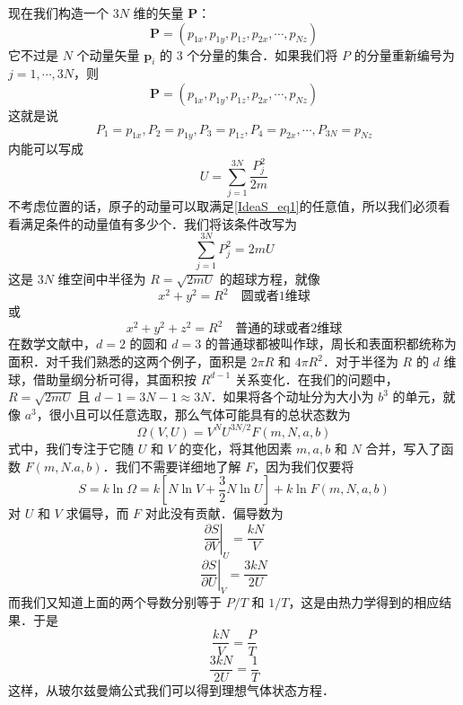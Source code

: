 现在我们构造一个 $3N $ 维的矢量 $\mathbf P$：
\begin{equation}
\mathbf{P}=\left( p_{1x},p_{1y},p_{1z},p_{2x},\cdots ,p_{Nz} \right) 
\end{equation}
它不过是 $N$ 个动量矢量 $\boldsymbol p_i$ 的 $3 $ 个分量的集合．如果我们将 $P $ 的分量重新编号为 $j=1, \cdots , 3N$，则
\begin{equation}
\mathbf{P}=\left( p_{1x},p_{1y},p_{1z},p_{2x},\cdots ,p_{Nz} \right) 
\end{equation}
这就是说
\begin{equation}
P_1=p_{1x},P_2=p_{1y},P_3=p_{1z},P_4=p_{2x},\cdots ,P_{3N}=p_{Nz}
\end{equation}
内能可以写成
\begin{equation} \label{IdeaS_eq1}
U=\sum_{j=1}^{3N}{\frac{P_{j}^{2}}{2m}}
\end{equation}
不考虑位置的话，原子的动量可以取满足\eqref{IdeaS_eq1}的任意值，所以我们必须看看满足条件的动量值有多少个．我们将该条件改写为
\begin{equation}
\sum_{j=1}^{3N}{P_{j}^{2}}=2mU
\end{equation}
这是 $3N$ 维空间中半径为 $R=\sqrt{2mU}$ 的超球方程，就像
\begin{equation}
x^2+y^2=R^2 \quad \text{圆或者1维球}
\end{equation}
或
\begin{equation}
x^2+y^2+z^2=R^2 \quad \text{普通的球或者2维球}
\end{equation}
在数学文献中，$ d=2 $ 的圆和 $d=3 $ 的普通球都被叫作球，周长和表面积都统称为面积．对千我们熟悉的这两个例子，面积是 $2\pi R$ 和 $4\pi R^2$．对于半径为 $R $ 的 $d $ 维球，借助量纲分析可得，其面积按 $R^{d-1}$ 关系变化．在我们的问题中，$R=\sqrt{2mU}$ 且 $d-1 = 3N-1 \approx 3N$．如果将各个动址分为大小为 $b^3$ 的单元，就像 $a^3$，很小且可以任意选取，那么气体可能具有的总状态数为
\begin{equation}
\Omega \left( V,U \right) =V^NU^{3N/2}F\left( m,N,a,b \right) 
\end{equation}
式中，我们专注于它随 $U $ 和 $V $ 的变化，将其他因素 $m, a, b $ 和 $N $ 合并，写入了函数 $F(m, N. a, b) $．我们不需要详细地了解 $F$，因为我们仅要将
\begin{equation}
S=k\ln \Omega =k\left[ N\ln V+\frac{3}{2}N\ln U \right] +k\ln F\left( m,N,a,b \right) 
\end{equation}
对 $U $ 和 $V $ 求偏导，而 $F $ 对此没有贡献．偏导数为
\begin{equation}
\left. \frac{\partial S}{\partial V} \right |_{U}^{}=\frac{kN}{V}
\end{equation}
\begin{equation}
\left. \frac{\partial S}{\partial U}\right |_{V}^{}=\frac{3kN}{2U}
\end{equation}
而我们又知道上面的两个导数分别等于 $P/T$ 和 $1/T$，这是由热力学得到的相应结果．于是
\begin{equation}
\dfrac{kN}{V}=\dfrac{P}{T}
\end{equation}
\begin{equation}
\dfrac{3kN}{2U} = \dfrac{1}{T}
\end{equation}
这样，从玻尔兹曼熵公式我们可以得到理想气体状态方程．
